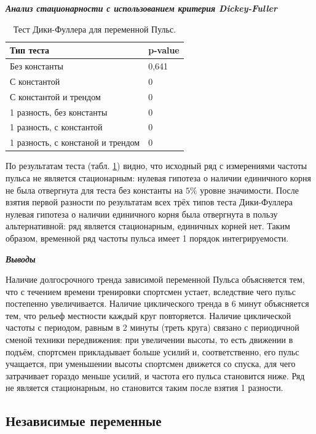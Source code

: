 \documentclass[a4paper,12pt]{article}
\begin{document}
\textbf{\textit{Анализ стационарности с использованием критерия Dickey-Fuller}}

\begin{table}[H]
	\begin{center}
		\begin{tabular}{|l|l|}
			\hline
			Тип теста &p-value \\
			\hline
			Без константы &0,641 \\
			\hline
			С константой &0 \\
			\hline
			С константой и трендом &0 \\
			\hline
			1 разность, без константы & 0\\
			\hline
			1 разность, с константой & 0\\
			\hline
			1 разность, с констаной и трендом & 0\\
			\hline
		\end{tabular}
	\end{center}
	\caption{Тест Дики-Фуллера для переменной Пульс.}
	\label{tab:DFhr}
\end{table}

По результатам теста (табл. \ref{tab:DFhr}) видно, что исходный ряд с измерениями частоты пульса не является стационарным: нулевая гипотеза о наличии единичного корня не была отвергнута для теста без константы на $5\%$ уровне значимости. После взятия первой разности по результатам всех трёх типов теста Дики-Фуллера нулевая гипотеза о наличии единичного корня была отвергнута в пользу альтернативной: ряд является стационарным, единичных корней нет. Таким образом, временной ряд частоты пульса имеет 1 порядок интегрируемости. 

\textbf{\textit{Выводы}}

Наличие долгосрочного тренда зависимой переменной Пульса объясняется тем, что с течением времени тренировки спортсмен устает, вследствие чего пульс постепенно увеличивается. Наличие циклического тренда в 6 минут объясняется тем, что рельеф местности каждый круг повторяется. Наличие циклической частоты с периодом, равным в 2 минуты (треть круга) связано с периодичной сменой техники передвижения: при увеличении высоты, то есть движении в подъём, спортсмен прикладывает больше усилий и, соответственно, его пульс учащается, при уменьшении высоты спортсмен движется со спуска, для чего затрачивает гораздо меньше усилий, и частота его пульса становится ниже. Ряд не является стационарным, но становится таким после взятия 1 разности.%

\subsection{Независимые переменные}
\end{document}
